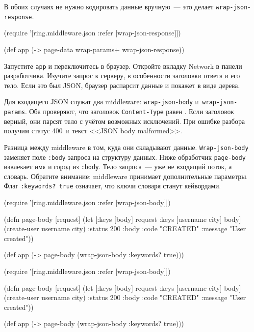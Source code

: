 \fi

\noindent
В обоих случаях не нужно кодировать данные вручную~--- это делает
\verb|wrap-json-response|.

\begin{english}
  \begin{clojure}
(require '[ring.middleware.json
           :refer [wrap-json-response]])

(def app (-> page-data
             wrap-params+
             wrap-json-response))
  \end{clojure}
\end{english}

Запустите \verb|app| и переключитесь в браузер. Откройте вкладку Network в
панели разработчика. Изучите запрос к серверу, в особенности заголовки ответа и
его тело. Если это был JSON, браузер распарсит данные и покажет в виде дерева.

Для входящего JSON служат два middleware: \verb|wrap-json-body|
и~\verb|wrap-json-params|. Оба проверяют, что заголовок \verb|Content-Type|
равен . Если заголовок верный, они парсят тело с учётом
возможных исключений. При ошибке разбора получим статус 400~и текст <<JSON body
malformed>>.

Разница между middleware в том, куда они складывают
данные. \verb|Wrap-json-body| заменяет поле \verb|:body| запроса на
структуру данных. Ниже обработчик \verb|page-body| извлекает имя и город из
\verb|:body|. Тело запроса~--- уже не входящий поток, а словарь. Обратите
внимание: middleware принимает дополнительные параметры. Флаг \verb|:keywords? true|
означает, что ключи словаря станут кейвордами.

\ifnarrow

\begin{english}
  \begin{clojure}
(require '[ring.middleware.json
           :refer [wrap-json-body]])

(defn page-body [request]
  (let [{:keys [body]} request
        {:keys [username city]} body]
    (create-user username city)
    {:status 200
     :body {:code "CREATED"
            :message "User created"}}))

(def app
  (->
    page-body
    (wrap-json-body {:keywords? true})))
  \end{clojure}
\end{english}

\else

\begin{english}
  \begin{clojure}
(require '[ring.middleware.json
           :refer [wrap-json-body]])

(defn page-body [request]
  (let [{:keys [body]} request
        {:keys [username city]} body]
    (create-user username city)
    {:status 200
     :body {:code "CREATED"
            :message "User created"}}))

(def app (-> page-body
             (wrap-json-body {:keywords? true})))
  \end{clojure}
\end{english}

